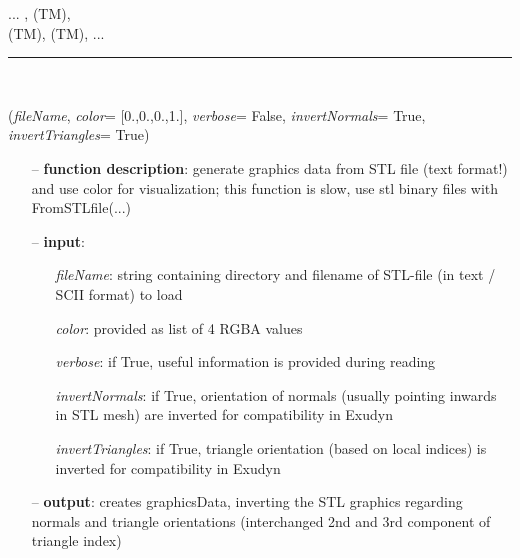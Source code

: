 \begin{itemize}[leftmargin=1.4cm]
\begin{itemize}[leftmargin=1.4cm]
\begin{itemize}[leftmargin=1.4cm]
\begin{itemize}[leftmargin=0.5cm]
\begin{itemize}[leftmargin=1.4cm]
\begin{itemize}[leftmargin=1.4cm]
\begin{itemize}[leftmargin=0.5cm]
\begin{itemize}[leftmargin=1.4cm]
 ...
, 
 (TM), 
\\  (TM), 
 (TM), 
 ...

\ei

%
\noindent\rule{8cm}{0.75pt}\vspace{1pt} \\ 
\begin{flushleft}
\label{sec:graphics:FromSTLfileASCII}
({\it fileName}, {\it color}= [0.,0.,0.,1.], {\it verbose}= False, {\it invertNormals}= True, {\it invertTriangles}= True)
\end{flushleft}
\setlength{\itemindent}{0.7cm}
\begin{itemize}[leftmargin=0.7cm]
\item[--]
{\bf function description}: generate graphics data from STL file (text format!) and use color for visualization; this function is slow, use stl binary files with FromSTLfile(...)
\item[--]
{\bf input}: \vspace{-6pt}
\begin{itemize}[leftmargin=1.2cm]
\setlength{\itemindent}{-0.7cm}
\item[]{\it fileName}: string containing directory and filename of STL-file (in text / SCII format) to load
\item[]{\it color}: provided as list of 4 RGBA values
\item[]{\it verbose}: if True, useful information is provided during reading
\item[]{\it invertNormals}: if True, orientation of normals (usually pointing inwards in STL mesh) are inverted for compatibility in Exudyn
\item[]{\it invertTriangles}: if True, triangle orientation (based on local indices) is inverted for compatibility in Exudyn
\end{itemize}
\item[--]
{\bf output}: creates graphicsData, inverting the STL graphics regarding normals and triangle orientations (interchanged 2nd and 3rd component of triangle index)

\end{itemize}
\end{itemize}
\end{itemize}
\end{itemize}
\end{itemize}
\end{itemize}
\end{itemize}
\end{itemize}
\end{itemize}

